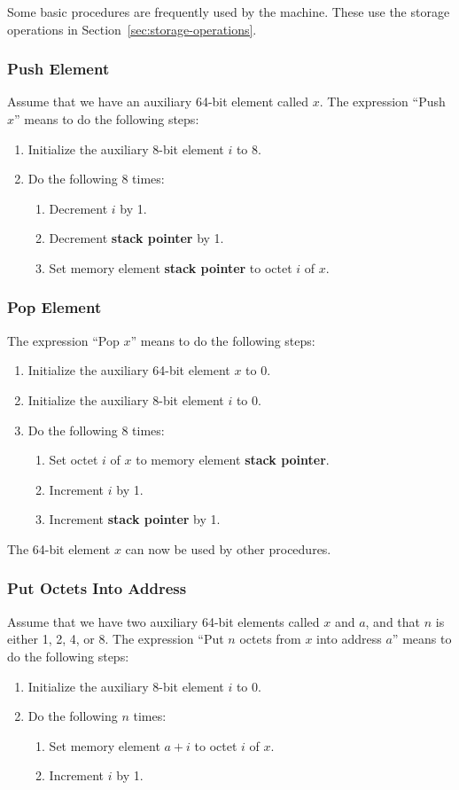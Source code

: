 \documentclass[a4paper,12pt]{article}
\newcommand{\SP}{\textbf{stack pointer}\xspace}
\begin{document}
Some basic procedures are frequently used by the machine.
These use the storage operations in Section~\ref{sec:storage-operations}.

\subsubsection{Push Element}

Assume that we have an auxiliary 64-bit element called $x$.
The expression ``Push $x$'' means to do the following steps:
\begin{enumerate}
\item Initialize the auxiliary 8-bit element $i$ to 8.
\item Do the following 8 times:
  \begin{enumerate}
  \item Decrement $i$ by 1.
  \item Decrement \SP by 1.
  \item Set memory element \SP to octet $i$ of $x$.
  \end{enumerate}
\end{enumerate}

\subsubsection{Pop Element}

The expression ``Pop $x$'' means to do the following steps:
\begin{enumerate}
\item Initialize the auxiliary 64-bit element $x$ to 0.
\item Initialize the auxiliary 8-bit element $i$ to 0.
\item Do the following 8 times:
  \begin{enumerate}
  \item Set octet $i$ of $x$ to memory element \SP.
  \item Increment $i$ by 1.
  \item Increment \SP by 1.
  \end{enumerate}
\end{enumerate}
The 64-bit element $x$ can now be used by other procedures.

\subsubsection{Put Octets Into Address}

Assume that we have two auxiliary 64-bit elements called $x$ and $a$, and that $n$ is either 1, 2, 4, or 8.
The expression ``Put $n$ octets from $x$ into address $a$'' means to do the following steps:
\begin{enumerate}
\item Initialize the auxiliary 8-bit element $i$ to 0.
\item Do the following $n$ times:
  \begin{enumerate}
  \item Set memory element $a+i$ to octet $i$ of $x$.
  \item Increment $i$ by 1.
  \end{enumerate}
\end{enumerate}
\end{document}
